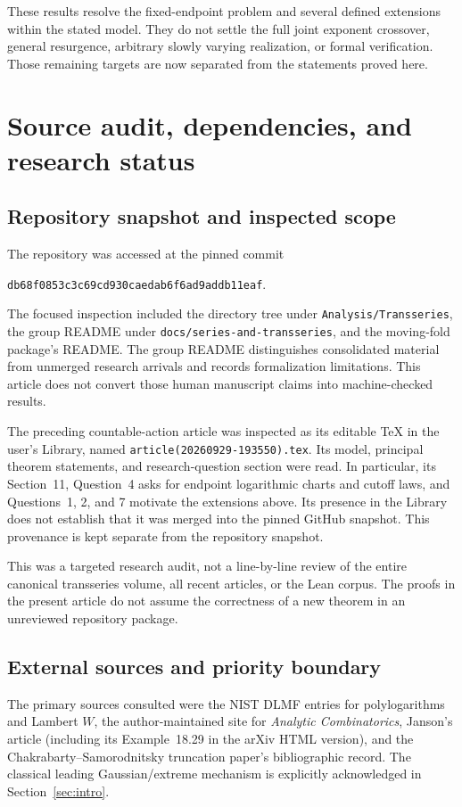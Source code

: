 \documentclass[11pt,a4paper]{article}
\numberwithin{equation}{section}
\theoremstyle{definition}
\theoremstyle{remark}
\begin{document}
These results resolve the fixed-endpoint problem and several defined
extensions within the stated model. They do not settle the full joint
exponent crossover, general resurgence, arbitrary slowly varying
realization, or formal verification. Those remaining targets are now
separated from the statements proved here.

\appendix
\section{Source audit, dependencies, and research status}
\label{app:audit}

\subsection{Repository snapshot and inspected scope}
The repository was accessed at the pinned commit
\begin{center}
\small\texttt{db68f0853c3c69cd930caedab6f6ad9addb11eaf}.
\end{center}
The focused inspection included the directory tree under
\texttt{Analysis/Transseries}, the group README under
\texttt{docs/series-and-transseries}, and the moving-fold package's
README. The group README distinguishes consolidated material from
unmerged research arrivals and records formalization limitations.
This article does not convert those human manuscript claims into
machine-checked results.

The preceding countable-action article \cite{previous} was inspected
as its editable TeX in the user's Library, named
\texttt{article(20260929-193550).tex}. Its model, principal theorem
statements, and research-question section were read. In particular,
its Section~11, Question~4 asks for endpoint logarithmic charts and
cutoff laws, and Questions~1, 2, and 7 motivate the extensions above.
Its presence in the Library does not establish that it was merged into
the pinned GitHub snapshot. This provenance is kept separate from the
repository snapshot.

This was a targeted research audit, not a line-by-line review of the
entire canonical transseries volume, all recent articles, or the Lean
corpus. The proofs in the present article do not assume the correctness
of a new theorem in an unreviewed repository package.

\subsection{External sources and priority boundary}
The primary sources consulted were the NIST DLMF entries for
polylogarithms and Lambert $W$, the author-maintained site for
\emph{Analytic Combinatorics}, Janson's article (including its
Example~18.29 in the arXiv HTML version), and the
Chakrabarty--Samorodnitsky truncation paper's bibliographic record.
The classical leading Gaussian/extreme mechanism is explicitly
acknowledged in Section~\ref{sec:intro}.
\end{document}
